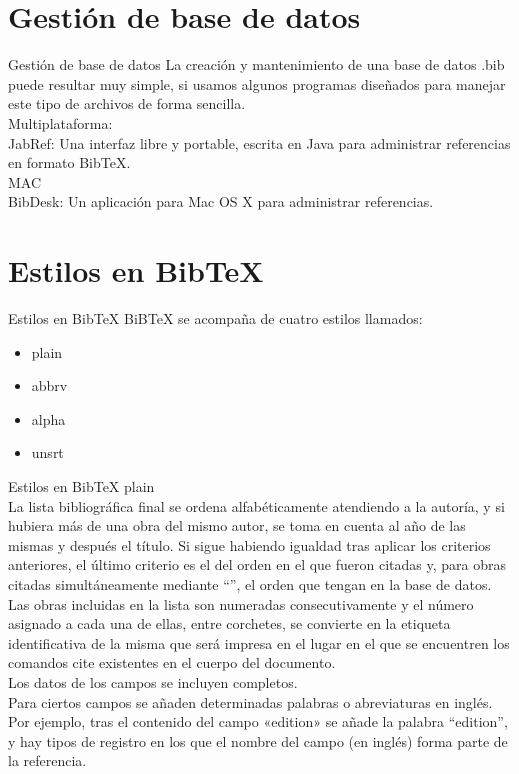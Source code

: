 \documentclass[9pt]{beamer}
\begin{document}
\section{Gestión de base de datos}
\begin{frame}{Gestión de base de datos}
La creación y mantenimiento de una base de datos .bib puede resultar muy simple, si usamos algunos programas diseñados para manejar este tipo de archivos de forma sencilla.\\
Multiplataforma:\\
JabRef: Una interfaz libre y portable, escrita en Java para administrar referencias en formato BibTeX.\\
MAC\\
BibDesk: Un aplicación para Mac OS X para administrar referencias.\\

\end{frame}

\section{Estilos en BibTeX}
\begin{frame}{Estilos en BibTeX}
BiBTeX se acompaña de cuatro estilos llamados:
\begin{itemize}
\item plain
\item abbrv
\item alpha
\item unsrt
\end{itemize} 

\end{frame}

\begin{frame}{Estilos en BibTeX}
plain\\
    La lista bibliográfica final se ordena alfabéticamente atendiendo a la autoría, y si hubiera más de una obra del mismo autor, se toma en cuenta al año de las mismas y después el título. Si sigue habiendo igualdad tras aplicar los criterios anteriores, el último criterio es el del orden en el que fueron citadas y, para obras citadas simultáneamente mediante “\nocite{*}”, el orden que tengan en la base de datos.\\
    Las obras incluidas en la lista son numeradas consecutivamente y el número asignado a cada una de ellas, entre corchetes, se convierte en la etiqueta identificativa de la misma que será impresa en el lugar en el que se encuentren los comandos cite existentes en el cuerpo del documento.\\
    Los datos de los campos se incluyen completos.\\
    Para ciertos campos se añaden determinadas palabras o abreviaturas en inglés. Por ejemplo, tras el contenido del campo «edition» se añade la palabra “edition”, y hay tipos de registro en los que el nombre del campo (en inglés) forma parte de la referencia.\\
    
\end{frame}
\end{document}

